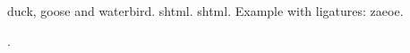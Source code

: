 \documentclass{article}
\begin{document}
\Gls{duck}, \gls{goose} and \gls{waterbird}.
\Gls{shtml}. \Gls{shtml}. Example with ligatures: \gls{zaeoe}.

.

\printunsrtglossaries
\end{document}
